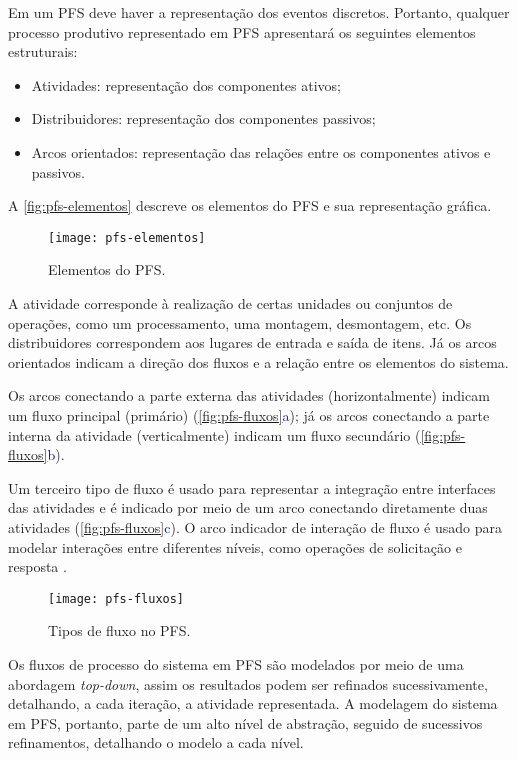 Em um PFS deve haver a representação dos eventos discretos. Portanto, qualquer processo produtivo representado em PFS apresentará os seguintes elementos estruturais:

\begin{itemize}
	\item Atividades: representação dos componentes ativos;
	\item Distribuidores: representação dos componentes passivos;
	\item Arcos orientados: representação das relações entre os componentes ativos  e passivos.
\end{itemize}

A \autoref{fig:pfs-elementos} descreve os elementos do PFS e sua representação gráfica.

\begin{figure}[htb]
	\centering
	\texttt{[image: pfs-elementos]}
	\caption{Elementos do PFS.}
	\label{fig:pfs-elementos}
\end{figure}

A atividade corresponde à realização de certas unidades ou conjuntos de operações, como um processamento, uma montagem, desmontagem, etc. Os distribuidores correspondem aos lugares de entrada e saída de itens. Já os arcos orientados indicam a direção dos fluxos e a relação entre os elementos do sistema.

Os arcos conectando a parte externa das atividades (horizontalmente) indicam um fluxo principal (primário) (\autoref{fig:pfs-fluxos}\textcolor{blue}{a}); já os arcos conectando a parte interna da atividade (verticalmente) indicam um fluxo secundário (\autoref{fig:pfs-fluxos}\textcolor{blue}{b})\cite{miyagi1996controle}.

Um terceiro tipo de fluxo é usado para representar a integração entre interfaces das atividades e é indicado por meio de um arco conectando diretamente duas atividades (\autoref{fig:pfs-fluxos}\textcolor{blue}{c}). O arco indicador de interação de fluxo é usado para modelar interações entre diferentes níveis, como operações de solicitação e resposta \cite{pisching2018pfs}.

\begin{figure}[htb]
	\centering
	\texttt{[image: pfs-fluxos]}
	\caption{Tipos de fluxo no PFS.}
	\label{fig:pfs-fluxos}
\end{figure}

Os fluxos de processo do sistema em PFS são modelados por meio de uma abordagem \textit{top-down}, assim os resultados podem ser refinados sucessivamente, detalhando, a cada iteração, a atividade representada. A modelagem do sistema em PFS, portanto, parte de um alto nível de abstração, seguido de sucessivos refinamentos, detalhando o modelo a cada nível.

